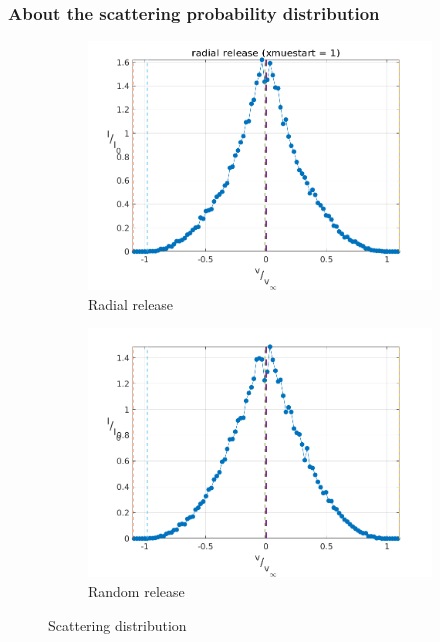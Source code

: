 \documentclass[../main/main.tex]{subfiles}
\begin{document}
\subsubsection{About the scattering probability distribution}
\begin{figure}[!htbp]
\hspace*{-0.5in}
\centering
\begin{subfigure}{.6\textwidth}
\includegraphics[width=1\textwidth]{../../two_resonance_lines/figures/scattering_distribution_radial_release.png}
\caption{Radial release}
\end{subfigure}%
\begin{subfigure}{.6\textwidth}
\includegraphics[width=1\textwidth]{../../two_resonance_lines/figures/scattering_distribution_random_release.png}
\caption{Random release}
\end{subfigure}
\caption{Scattering distribution}
\label{PCyg_mu_eq_1}
\end{figure}
\end{document}
